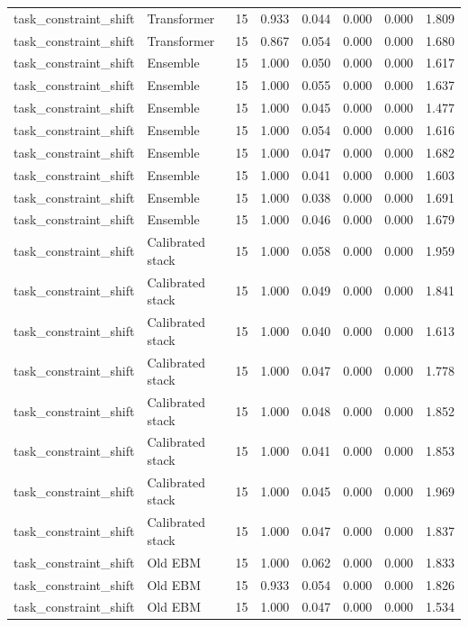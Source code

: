 {\begin{longtable}{llrrrrrr}
task\_constraint\_shift & Transformer & 15 & 0.933 & 0.044 & 0.000 & 0.000 & 1.809 \\
task\_constraint\_shift & Transformer & 15 & 0.867 & 0.054 & 0.000 & 0.000 & 1.680 \\
task\_constraint\_shift & Ensemble & 15 & 1.000 & 0.050 & 0.000 & 0.000 & 1.617 \\
task\_constraint\_shift & Ensemble & 15 & 1.000 & 0.055 & 0.000 & 0.000 & 1.637 \\
task\_constraint\_shift & Ensemble & 15 & 1.000 & 0.045 & 0.000 & 0.000 & 1.477 \\
task\_constraint\_shift & Ensemble & 15 & 1.000 & 0.054 & 0.000 & 0.000 & 1.616 \\
task\_constraint\_shift & Ensemble & 15 & 1.000 & 0.047 & 0.000 & 0.000 & 1.682 \\
task\_constraint\_shift & Ensemble & 15 & 1.000 & 0.041 & 0.000 & 0.000 & 1.603 \\
task\_constraint\_shift & Ensemble & 15 & 1.000 & 0.038 & 0.000 & 0.000 & 1.691 \\
task\_constraint\_shift & Ensemble & 15 & 1.000 & 0.046 & 0.000 & 0.000 & 1.679 \\
task\_constraint\_shift & Calibrated stack & 15 & 1.000 & 0.058 & 0.000 & 0.000 & 1.959 \\
task\_constraint\_shift & Calibrated stack & 15 & 1.000 & 0.049 & 0.000 & 0.000 & 1.841 \\
task\_constraint\_shift & Calibrated stack & 15 & 1.000 & 0.040 & 0.000 & 0.000 & 1.613 \\
task\_constraint\_shift & Calibrated stack & 15 & 1.000 & 0.047 & 0.000 & 0.000 & 1.778 \\
task\_constraint\_shift & Calibrated stack & 15 & 1.000 & 0.048 & 0.000 & 0.000 & 1.852 \\
task\_constraint\_shift & Calibrated stack & 15 & 1.000 & 0.041 & 0.000 & 0.000 & 1.853 \\
task\_constraint\_shift & Calibrated stack & 15 & 1.000 & 0.045 & 0.000 & 0.000 & 1.969 \\
task\_constraint\_shift & Calibrated stack & 15 & 1.000 & 0.047 & 0.000 & 0.000 & 1.837 \\
task\_constraint\_shift & Old EBM & 15 & 1.000 & 0.062 & 0.000 & 0.000 & 1.833 \\
task\_constraint\_shift & Old EBM & 15 & 0.933 & 0.054 & 0.000 & 0.000 & 1.826 \\
task\_constraint\_shift & Old EBM & 15 & 1.000 & 0.047 & 0.000 & 0.000 & 1.534 \\

\end{longtable}}
